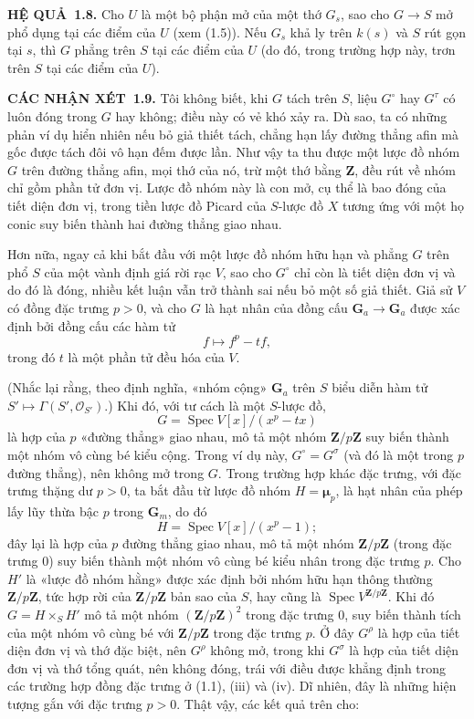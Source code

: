 \documentclass[11pt,twoside,openany]{book}
\numberwithin{equation}{section}
\newcommand{\src}[1]{%
  \phantomsection\hypertarget{src:\fgasourceid:#1}{}%
  \marginpar{\raggedleft\footnotesize\sffamily #1}%
}
\newcommand{\fgasourceid}{unset}
\newcommand{\result}[2]{\par\medskip\noindent\textbf{#1\if\relax\detokenize{#2}\relax\else\ #2\fi.}\quad}
\begin{document}
\result{HỆ QUẢ}{1.8} Cho $U$ là một bộ phận mở của một thớ $G_s$, sao cho
$G\longrightarrow S$ mở phổ dụng tại các điểm của $U$ (xem (1.5)). Nếu $G_s$
khả ly trên $k(s)$ và $S$ rút gọn tại $s$, thì $G$ phẳng trên $S$ tại các điểm
của $U$ (do đó, trong trường hợp này, trơn trên $S$ tại các điểm của $U$).

\result{CÁC NHẬN XÉT}{1.9} Tôi không biết, khi $G$ tách trên $S$, liệu
$G^\circ$ hay $G^\tau$ có luôn đóng trong $G$ hay không; điều này có vẻ khó xảy
ra. Dù sao, ta có những phản ví dụ hiển nhiên nếu bỏ giả thiết tách, chẳng hạn
lấy đường thẳng afin mà gốc được tách đôi vô hạn đếm được lần. Như vậy ta thu
được một lược đồ nhóm $G$ trên đường thẳng afin, mọi thớ của nó, trừ một thớ
bằng $\mathbf Z$, đều rút về nhóm chỉ gồm phần tử đơn vị. Lược đồ nhóm này là
con mở, cụ thể là bao đóng của tiết diện đơn vị, trong tiền lược đồ Picard của
$S$-lược đồ $X$ tương ứng với một họ conic suy biến thành hai đường thẳng giao
nhau.

Hơn nữa, ngay cả khi bắt đầu với một lược đồ nhóm hữu hạn và phẳng $G$ trên
phổ $S$ của một vành định giá rời rạc $V$, sao cho $G^\circ$ chỉ còn là tiết
diện đơn vị và do đó là đóng, nhiều kết luận vẫn trở thành sai nếu bỏ một số
giả thiết. Giả sử $V$ có đồng đặc trưng $p>0$, và cho $G$ là hạt nhân của đồng
cấu
$\mathbf G_a\longrightarrow\mathbf G_a$ được xác định bởi đồng cấu các hàm tử
\[
f\longmapsto f^p-tf,
\]
trong đó $t$ là một phần tử đều hóa của $V$.
\src{230}
(Nhắc lại rằng, theo định nghĩa, «nhóm cộng» $\mathbf G_a$ trên $S$ biểu diễn
hàm tử $S'\longmapsto\Gamma(S',\mathcal O_{S'})$.) Khi đó, với tư cách là một
$S$-lược đồ,
\[
G=\operatorname{Spec}V[x]/(x^p-tx)
\]
là hợp của $p$ «đường thẳng» giao nhau, mô tả một nhóm
$\mathbf Z/p\mathbf Z$ suy biến thành một nhóm vô cùng bé kiểu cộng. Trong ví
dụ này, $G^\circ=G^\sigma$ (và đó là một trong $p$ đường thẳng), nên không mở
trong $G$. Trong trường hợp khác đặc trưng, với đặc trưng thặng dư $p>0$, ta
bắt đầu từ lược đồ nhóm $H=\symbf{\mu}_p$, là hạt nhân của phép lấy lũy thừa
bậc $p$ trong $\mathbf G_m$, do đó
\[
H=\operatorname{Spec}V[x]/(x^p-1) ;
\]
đây lại là hợp của $p$ đường thẳng giao nhau, mô tả một nhóm
$\mathbf Z/p\mathbf Z$ (trong đặc trưng 0) suy biến thành một nhóm vô cùng bé
kiểu nhân trong đặc trưng $p$. Cho $H'$ là «lược đồ nhóm hằng» được xác định
bởi nhóm hữu hạn thông thường $\mathbf Z/p\mathbf Z$, tức hợp rời của
$\mathbf Z/p\mathbf Z$ bản sao của $S$, hay cũng là
$\operatorname{Spec}V^{\mathbf Z/p\mathbf Z}$. Khi đó $G=H\times_S H'$ mô tả
một nhóm $(\mathbf Z/p\mathbf Z)^2$ trong đặc trưng 0, suy biến thành tích của
một nhóm vô cùng bé với $\mathbf Z/p\mathbf Z$ trong đặc trưng $p$. Ở đây
$G^\rho$ là hợp của tiết diện đơn vị và thớ đặc biệt, nên $G^\rho$ không mở,
trong khi $G^\sigma$ là hợp của tiết diện đơn vị và thớ tổng quát, nên không
đóng, trái với điều được khẳng định trong các trường hợp đồng đặc trưng ở
(1.1), (iii) và (iv). Dĩ nhiên, đây là những hiện tượng gắn với đặc trưng
$p>0$. Thật vậy, các kết quả trên cho:
\end{document}
